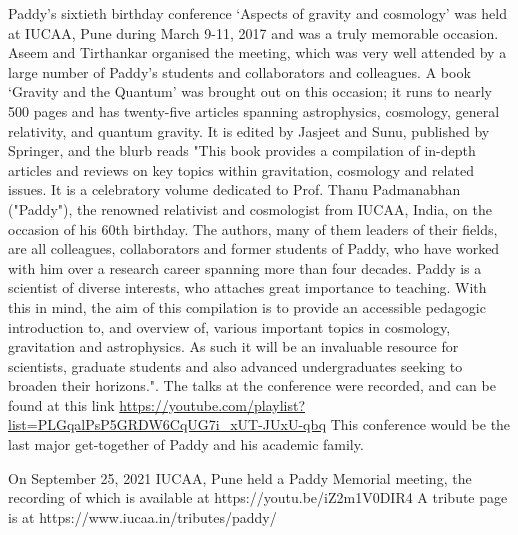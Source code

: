 \documentclass[prd, preprint, longbibliography, 11pt]{revtex4-1}
\begin{document}
Paddy's sixtieth birthday conference `Aspects of gravity and cosmology' was held at IUCAA, Pune during March 9-11, 2017 and was a truly memorable occasion. Aseem and Tirthankar organised the meeting, which was very well attended by a large number of Paddy's students and collaborators and colleagues. A book `Gravity and the Quantum' was brought out on this occasion; it runs to nearly 500 pages and has twenty-five articles spanning astrophysics, cosmology, general relativity, and quantum gravity. It is edited by Jasjeet and Sunu, published by Springer, and the blurb reads "This book provides a compilation of in-depth articles and reviews on key topics within gravitation, cosmology and related issues. It is a celebratory volume dedicated to Prof. Thanu Padmanabhan ("Paddy"), the renowned relativist and cosmologist from IUCAA, India, on the occasion of his 60th birthday. The authors, many of them leaders of their fields, are all colleagues, collaborators and former students of Paddy, who have worked with him over a research career spanning more than four decades. Paddy is a scientist of diverse interests, who attaches great importance to teaching. With this in mind, the aim of this compilation is to provide an accessible pedagogic introduction to, and overview of, various important topics in cosmology, gravitation and astrophysics. As such it will be an invaluable resource for scientists, graduate students and also advanced undergraduates seeking to broaden their horizons.". The talks at the conference were recorded, and can be found at this link \url {https://youtube.com/playlist?list=PLGqalPsP5GRDW6CqUG7i_xUT-JUxU-qbq} This conference would be the last major get-together of Paddy and his academic family.

On September 25, 2021 IUCAA, Pune held a Paddy Memorial meeting, the recording of which is available at https://youtu.be/iZ2m1V0DIR4 A tribute page is at https://www.iucaa.in/tributes/paddy/
\end{document}
